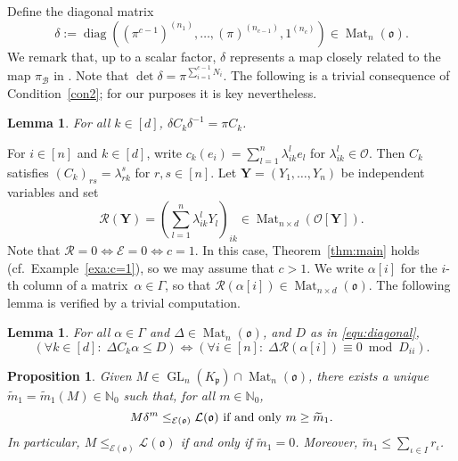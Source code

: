 \documentclass[11pt]{amsart}
\numberwithin{equation}{section}
\numberwithin{figure}{section}
\theoremstyle{plain}
\newtheorem{proposition}[theorem]{Proposition}
\newtheorem{lemma}[theorem]{Lemma}
\theoremstyle{definition}
\theoremstyle{remark}
\begin{document}
Define the diagonal matrix
\begin{equation}\label{def:delta}
\delta :=
\operatorname{diag}((\pi^{c-1})^{(n_1)},\dots,(\pi)^{(n_{c-1})},1^{(n_c)})\in\operatorname{Mat}_n({\mathfrak o}).
\end{equation}
We remark that, up to a scalar factor, $\delta$ represents a map
closely related to the map $\pi_{\mathcal{B}}$ in
\cite[Definition~4.40]{duSWoodward/08}. Note that $\det \delta =
\pi^{\sum_{i=1}^{c-1}N_i}$. The following is a trivial consequence of
Condition~\ref{con2}; for our purposes it is key nevertheless.

\begin{lemma}\label{lem:3}
  For all $k\in[d]$, $\delta C_k \delta^{-1} = \pi C_k$.
\end{lemma}

For $i\in[n]$ and $k\in[d]$, write
$c_k(e_i)=\sum_{l=1}^n\lambda_{ik}^l e_l$ for
$\lambda_{ik}^l\in{\ensuremath{\mathcal{O}}}$. Then $C_k$ satisfies $\left(
C_k\right)_{rs}=\lambda^s_{rk}$ for $r,s\in[n]$.  Let ${\ensuremath{\mathbf{Y}}}=(Y_1,\dots,Y_n)$ be independent variables and set
$${\mathcal{R}}({\ensuremath{\mathbf{Y}}}) = \left( \sum_{l=1}^n \lambda_{ik}^l
  Y_l\right)_{ik}\in\operatorname{Mat}_{n\times d}({\ensuremath{\mathcal{O}}}[{\ensuremath{\mathbf{Y}}}]).$$ Note that ${\mathcal{R}}=0
\Leftrightarrow {\mathcal{E}}=0 \Leftrightarrow c=1$. In this case,
Theorem~\ref{thm:main} holds (cf.\ Example~\ref{exa:c=1}), so we may
assume that $c>1$. We write $\alpha[i]$ for the $i$-th column of a
matrix~$\alpha\in\Gamma$, so that ${\mathcal{R}}(\alpha[i])\in\operatorname{Mat}_{n\times
  d}({\mathfrak o})$.  The following lemma is verified by a trivial
computation.

\begin{lemma}\label{lem:2}
  For all $\alpha\in\Gamma$ and $\Delta\in\operatorname{Mat}_n({\mathfrak o})$, and $D$ as in
  \eqref{equ:diagonal},
$$\left( \forall k\in[d]:\; \Delta C_k\alpha\leq D\right) \Leftrightarrow \left( \forall
i\in [n]:\; \Delta {\mathcal{R}}(\alpha[i])\equiv 0 \bmod D_{ii}\right).$$
\end{lemma}

\begin{proposition}\label{prop:1}
Given $M\in\operatorname{GL}_n(K_{\mathfrak{p}})\cap \operatorname{Mat}_n({\mathfrak o})$, there exists a unique
${\ensuremath{\widetilde{m}}}_1={\ensuremath{\widetilde{m}}}_1(M)\in{\ensuremath{\mathbb{N}}}_0$ such that, for all $m\in{\ensuremath{\mathbb{N}}}_0$,
$$M\delta^m\leq_{{\mathcal{E}}({\mathfrak o})} {\ensuremath{\mathcal{L}}}({\mathfrak o})\textup{ if and only }m\geq
{\ensuremath{\widetilde{m}}}_1.$$ In particular, $M \leq_{{\mathcal{E}}({\mathfrak o})} {\ensuremath{\mathcal{L}}}({\mathfrak o})$ if and only
if ${\ensuremath{\widetilde{m}}}_1=0$. Moreover, ${\ensuremath{\widetilde{m}}}_1 \leq \sum_{\iota\in I}r_{\iota}$.
\end{proposition}
\end{document}
